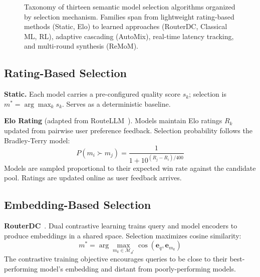 \begin{figure}[t]
{
}
\caption{Taxonomy of thirteen semantic model selection algorithms organized by selection mechanism.  Families span from lightweight rating-based methods (Static, Elo) to learned approaches (RouterDC, Classical ML, RL), adaptive cascading (AutoMix), real-time latency tracking, and multi-round synthesis (ReMoM).}
\label{fig:selection_taxonomy}
\end{figure}

\subsection{Rating-Based Selection}

\noindent\textbf{Static.}
Each model carries a pre-configured quality score $s_k$; selection is $m^* = \arg\max_k s_k$.
Serves as a deterministic baseline.

\noindent\textbf{Elo Rating} (adapted from RouteLLM~\cite{ong2024routellm}).
Models maintain Elo ratings $R_k$ updated from pairwise user preference feedback.
Selection probability follows the Bradley-Terry model:
\begin{equation}
  P(m_i \succ m_j) = \frac{1}{1 + 10^{(R_j - R_i)/400}}
\end{equation}
Models are sampled proportional to their expected win rate against the candidate pool.
Ratings are updated online as user feedback arrives.

\subsection{Embedding-Based Selection}

\noindent\textbf{RouterDC}~\cite{chen2024routerdc}.
Dual contrastive learning trains query and model encoders to produce embeddings in a shared space.
Selection maximizes cosine similarity:
\begin{equation}
  m^* = \arg\max_{m_k \in \mathcal{M}_{d^*}} \cos(\mathbf{e}_q, \mathbf{e}_{m_k})
\end{equation}
The contrastive training objective encourages queries to be close to their best-performing model's embedding and distant from poorly-performing models.

